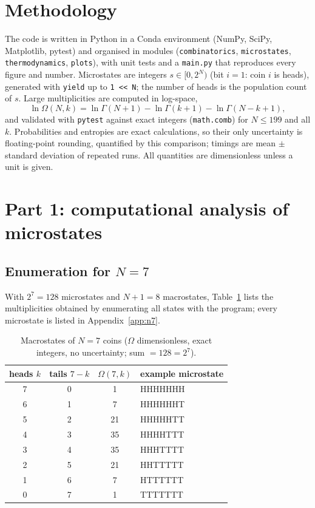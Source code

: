 \documentclass[11pt,a4paper]{article}
\newcommand{\Om}{\Omega}
\begin{document}
\section{Methodology}
The code is written in Python in a Conda environment (NumPy, SciPy, Matplotlib, pytest) and organised in modules
(\texttt{combinatorics}, \texttt{microstates}, \texttt{thermodynamics}, \texttt{plots}), with unit tests and a
\texttt{main.py} that reproduces every figure and number. Microstates are integers $s\in[0,2^N)$ (bit $i=1$: coin $i$ is heads),
generated with \texttt{yield} up to \texttt{1 << N}; the number of heads is the population count of $s$. Large multiplicities
are computed in log-space,
\begin{equation}
  \ln\Om(N,k)=\ln\Gamma(N+1)-\ln\Gamma(k+1)-\ln\Gamma(N-k+1),
  \label{eq:lngamma}
\end{equation}
and validated with \texttt{pytest} against exact integers (\texttt{math.comb}) for $N\le199$ and all $k$.
Probabilities and entropies are exact calculations, so their only uncertainty is floating-point rounding, quantified by this
comparison; timings are mean $\pm$ standard deviation of repeated runs. All quantities are dimensionless unless a unit is given.

\section{Part 1: computational analysis of microstates}
\subsection{Enumeration for $N=7$}
With $2^7=128$ microstates and $N+1=8$ macrostates, Table~\ref{tab:n7} lists the multiplicities obtained by
enumerating all states with the program; every microstate is listed in Appendix~\ref{app:n7}.
\begin{table}[H]
\centering\small
\begin{tabular}{@{}cccl@{}}
\toprule
heads $k$ & tails $7-k$ & $\Om(7,k)$ & example microstate \\ \midrule
7 & 0 & 1 & HHHHHHH \\ 6 & 1 & 7 & HHHHHHT \\ 5 & 2 & 21 & HHHHHTT \\ 4 & 3 & 35 & HHHHTTT \\
3 & 4 & 35 & HHHTTTT \\ 2 & 5 & 21 & HHTTTTT \\ 1 & 6 & 7 & HTTTTTT \\ 0 & 7 & 1 & TTTTTTT \\ \bottomrule
\end{tabular}
\caption{Macrostates of $N=7$ coins ($\Om$ dimensionless, exact integers, no uncertainty; sum $=128=2^7$).}
\label{tab:n7}
\end{table}
\end{document}
